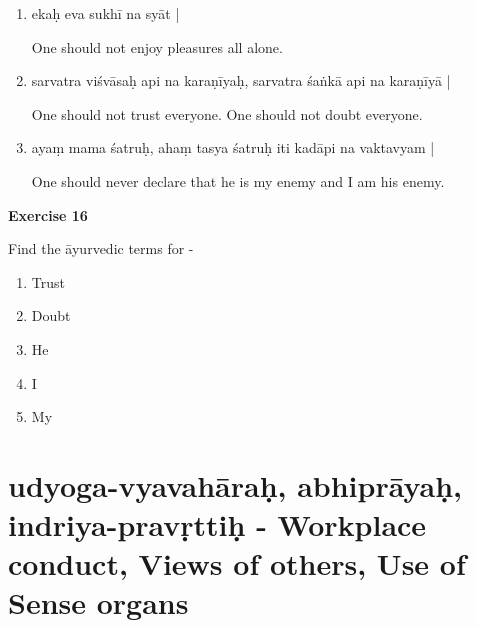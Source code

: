 \begin{enumerate}
\item {}

ekaḥ eva sukhī na syāt |

One should not enjoy pleasures all alone. 

\item {}

sarvatra viśvāsaḥ api na karaṇīyaḥ, sarvatra śaṅkā api na karaṇīyā |

One should not trust everyone. One should not doubt everyone. 

\item {}

ayaṃ mama śatruḥ, ahaṃ tasya śatruḥ iti kadāpi na vaktavyam |  

One should never declare that he is my enemy and I am his enemy.
\end{enumerate}

\begin{center}
\textbf{\large Exercise 16}
\end{center}

Find the āyurvedic terms for -

\begin{enumerate}
\renewcommand{\theenumi}{\alph{enumi}}
\renewcommand{\labelenumi}{\theenumi.}
\item Trust
\item Doubt
\item He
\item I
\item My
\end{enumerate}

\chapter{udyoga-vyavahāraḥ, abhiprāyaḥ, indriya-pravṛttiḥ - Workplace conduct, Views of others, Use of Sense organs}

